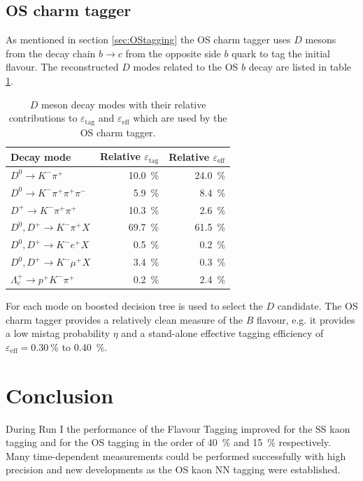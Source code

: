 \documentclass{PoS}
\begin{document}
\subsection{OS charm tagger}

As mentioned in section \ref{sec:OStagging} the OS charm tagger uses $D$ mesons from the decay chain $b\to c$ from the opposite side $b$ quark to tag the initial flavour. The reconstructed $D$ modes related to the OS $b$ decay are listed in table \ref{tab:OScharm}.
\begin{table}[htbp]
  \centering
  \begin{tabular}{lrr}
  \toprule
  Decay mode &Relative $\varepsilon_\text{tag}$ & Relative $\varepsilon_\text{eff}$ \\
  \midrule
  $D^0\to K^-\pi^+$ & \SI{10.0}{\%} & \SI{24.0}{\%} \\ 
  $D^0\to K^-\pi^+\pi^+\pi^-$ & \SI{5.9}{\%} & \SI{8.4}{\%} \\
  $D^+\to K^-\pi^+\pi^+$ & \SI{10.3}{\%} & \SI{2.6}{\%} \\
  $D^0,D^+\to K^-\pi^+X$ & \SI{69.7}{\%} & \SI{61.5}{\%} \\
  $D^0,D^+\to K^-e^+X$ & \SI{0.5}{\%} & \SI{0.2}{\%} \\
  $D^0,D^+\to K^-\mu^+X$ & \SI{3.4}{\%} & \SI{0.3}{\%} \\
  $\Lambda_c^+\to p^+K^-\pi^+$ & \SI{0.2}{\%} & \SI{2.4}{\%} \\
  \bottomrule
  \end{tabular}
  \small{\caption{$D$ meson decay modes with their relative contributions to $\varepsilon_\text{tag}$ and $\varepsilon_\text{eff}$ which are used by the OS charm tagger.}}
  \label{tab:OScharm}
\end{table}
For each mode on boosted decision tree is used to select the $D$ candidate. The OS charm tagger provides a relatively clean measure of the $B$ flavour, e.g. it provides a low mistag probability $\eta$ and a stand-alone effective tagging efficiency of $\varepsilon_\text{eff}=\SI{0.30}{\%}$ to \SI{0.40}{\%}.

\section{Conclusion}\label{sec:conclusion}

During Run I the performance of the Flavour Tagging improved for the SS kaon tagging and for the OS tagging in the order of \SI{40}{\%} and \SI{15}{\%} respectively. Many time-dependent measurements could be performed successfully with high precision and new developments as the OS kaon NN tagging were established. 
\end{document}
